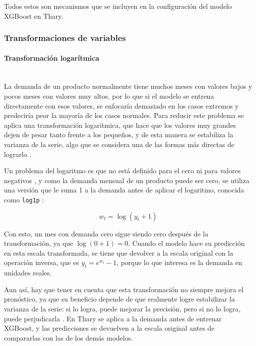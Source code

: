     Todos estos son mecanismos que se incluyen en la configuración del modelo XGBoost en Thary.

\subsubsection{Transformaciones de variables}

    \paragraph{Transformación logarítmica}\mbox{}\\
    La demanda de un producto normalmente tiene muchos meses con valores bajos y pocos meses con valores muy altos, por lo que si el modelo se entrena directamente con esos valores, se enfocaría demasiado en los casos extremos y predeciría peor la mayoría de los casos normales. Para reducir este problema se aplica una transformación logarítmica, que hace que los valores muy grandes dejen de pesar tanto frente a los pequeños, y de esta manera se estabiliza la varianza de la serie, algo que se considera una de las formas más directas de lograrlo \cite{hewamalage2021rnn}.

    Un problema del logaritmo es que no está definido para el cero ni para valores negativos \cite{hewamalage2021rnn}, y como la demanda mensual de un producto puede ser cero, se utiliza una versión que le suma 1 a la demanda antes de aplicar el logaritmo, conocida como \texttt{log1p} \cite{hewamalage2021rnn}:

    \begin{equation}
    w_t = \log(y_t + 1)
    \end{equation}

    Con esto, un mes con demanda cero sigue siendo cero después de la transformación, ya que $\log(0 + 1) = 0$. Cuando el modelo hace su predicción en esta escala transformada, se tiene que devolver a la escala original con la operación inversa, que es $y_t = e^{w_t} - 1$, porque lo que interesa es la demanda en unidades reales.

    Aun así, hay que tener en cuenta que esta transformación no siempre mejora el pronóstico, ya que su beneficio depende de que realmente logre estabilizar la varianza de la serie: si lo logra, puede mejorar la precisión, pero si no lo logra, puede perjudicarla \cite{luetkepohl2009log}. En Thary se aplica a la demanda antes de entrenar XGBoost, y las predicciones se devuelven a la escala original antes de compararlas con las de los demás modelos.
    
